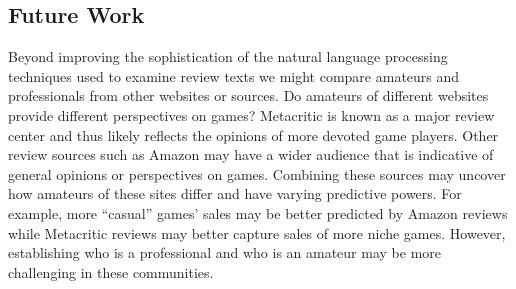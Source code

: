 \documentclass{sig-alternate}
\begin{document}
\subsection{Future Work}
Beyond improving the sophistication of the
natural language processing techniques used to examine review texts we
might compare amateurs and professionals from other websites or sources.
Do amateurs of different websites provide different perspectives on
games? Metacritic is known as a major review center and thus likely
reflects the opinions of more devoted game players. Other review sources
such as Amazon may have a wider audience that is indicative of general
opinions or perspectives on games. Combining these sources may uncover
how amateurs of these sites differ and have varying predictive powers.
For example, more ``casual'' games' sales may be better predicted by
Amazon reviews while Metacritic reviews may better capture sales of more
niche games. However, establishing who is a professional and who is an
amateur may be more challenging in these communities.


\end{document}
